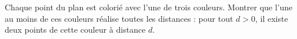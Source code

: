 Chaque point du plan est colorié avec l'une de trois couleurs. Montrer que l'une au moins de ces couleurs réalise toutes les distances : pour tout $d > 0$, il existe deux points de cette couleur à distance $d$.
